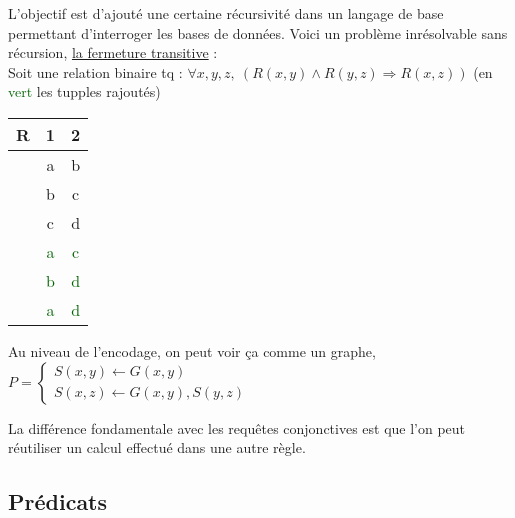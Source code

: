 \documentclass{article}
\newcommand{\gre}[1]{\textcolor{darkgreen}{#1}}
\begin{document}
L'objectif est d'ajouté une certaine récursivité dans un langage de base permettant d'interroger les bases de données. Voici un problème inrésolvable sans récursion,
\underline{la fermeture transitive} : \\ Soit une relation binaire tq : $\forall x,y,z,\ \left( R(x,y) \wedge R(y,z) \Rightarrow R(x,z)\right)$ (en \gre{vert} les tupples rajoutés)
\begin{center}
	\begin{tabular}{r|cc}
	R&1&2\\
	\hline
	& a & b\\
	& b & c\\
	& c & d\\
	\hline
	& \gre{a} & \gre{c}\\
	& \gre{b} & \gre{d}\\
	& \gre{a} & \gre{d}\\
	\end{tabular}
\end{center}

Au niveau de l'encodage, on peut voir ça comme un graphe, $P = \left\{ \begin{array}{l}
S(x,y) \leftarrow G(x,y) \\
S(x,z) \leftarrow G(x,y), S(y,z) \end{array}\right.$ 

\noindent La différence fondamentale avec les requêtes conjonctives est que l'on peut réutiliser un calcul effectué dans une autre règle.

\subsection{Prédicats}
\end{document}
